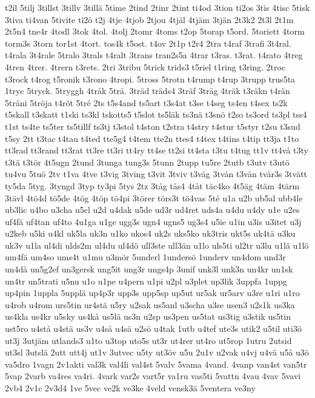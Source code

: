{t2il
5tilj
3tillst
3tillv
3tillä
5time
2tind
2tinr
2tint
ti4od
3tion
ti2os
3tis
4tisc
5tisk
3tiva
ti4van
5tivite
ti2ö
t2j
4tje
4tjob
2tjou
4tjäl
4tjäm
3tjän
2t3k2
2t3l
2t1m
2t5n4
tne4r
4todl
3tok
4tol.
4tolj
2tomr
4toms
t2op
5torap
t5ord.
5toriett
4torm
torm3s
3torn
tor1st
4tort.
tos4k
t5ost.
t4ov
2t1p
t2r4
2tra
t4raf
3trafi
3t4ral.
t4rala
3t4rale
5tralo
3trals
t4ralt
3trans
tran2s5a
4trar
t3ras.
t3rat.
t4rato
4treg
4tren
4trer.
4trern
t3rets.
2tri
3tribu
5trick
trids3
t5riel
t1ring
t3ring.
2troc
t3rock
t4rog
t5ronik
t3rono
4tropi.
5tross
5trotn
t4rump
t4rup
3trupp
trus5ta
1tryc
5tryck.
5tryggh
4tråk
5trä.
3träd
träds4
3träf
3träg
4träk
t3räkn
t4rän
5träni
5tröja
t4röt
5tré
2ts
t5s4and
ts5art
t3s4at
t3se
t4seg
ts4en
t4sex
ts2k
t5skall
t3skatt
t1ski
ts3kl
tskotts5
t5slot
ts5läk
ts3nä
t3snö
t2so
ts3ord
ts3pl
tss4
t1st
ts4te
ts5ter
ts5tillf
ts3tj
t3stol
t4ston
t2stra
t4stry
t4stur
t5styr
t2su
t3sud
t5sy
2tt
t3tac
t4tau
t4ted
tte5g4
t4tem
tte2n
ttes4
t4tex
t4tins
t4tip
tt3ja
t1to
tt3rad
tt3rand
tt3rat
tt3re
tt3ri
tt4ry
tt4se
tt2si
tt4sta
t3tu
t4tug
tt1v
tt4vå
t3ty
t3tä
t3tör
4t5ugn
2tund
3tunga
tung3s
5tunn
2tupp
tu5re
2tutb
t3utv
t3utö
tu4vu
5tuö
2tv
t1va
4tve
t3vig
3tving
t3vit
3tviv
t3våg
3tvån
t3vän
tvär3s
3tvätt
ty5da
5tyg.
3tyngd
3typ
ty3pi
5tys
2tz
3tåg
tås4
4tåt
täc4ko
4t5äg
4täm
4tärm
3tävl
4tö4d
tö5de
4tög
4töp
tö4pi
3törer
törs3t
tö4vas
5té
u1a
u2b
ub5al
ubb4le
ub3lic
u4bo
u3cha
u5cl
u2d
u4dak
u5de
ud3r
ud4ret
uds4a
u4du
u4dy
u1e
u2es
uf4fä
uf4tan
uf4to
4u1ga
u1ge
ugg3s
ugn4
ugns5
ug3s4
u5ie
u1in
u3is
u3itet
u3j
u2keb
u5ki
u4kl
uk5la
uk3n
u1ko
ukos4
uk2s
uks5ko
uk3tris
ukt5s
uk4tä
u3ku
uk3v
u1la
ul4di
ulds2m
ul4du
ul4dö
ull3ste
ull3än
u1lo
uls5ti
ul2tr
u3lu
u1lä
u1lö
um4fä
um4so
ums4t
u1mu
u3mör
5underl
1undersö
1underv
un4dom
und3r
un4då
un5g2ef
un3gersk
ung5it
ung3r
ungs4p
3unif
unk3l
unk3n
un4kr
un1sk
un4tr
un5trati
u5nu
u1o
u1pe
u4pern
u1pi
u2pl
u3plet
up3lik
3uppfa
1uppg
up4pin
1uppla
5upplä
up4p3r
upp3s
upp5sp
up5ut
ur5ak
ur5arv
u3re
u1ri
u1ro
u4rob
u4rom
urs5tin
ur4stä
u5ry
u2sak
us5anl
u3scha
u3se
usen3
u2s1k
us3ka
us4kla
us4kr
u5sky
us4kå
us5lä
us3n
u2sp
us3pen
us5tat
us3tig
u3stik
us5tin
ust5ro
u4stå
u4stä
us3v
u4så
u4sä
u2sö
u4tak
1utb
u4tef
ute3s
utik2
u5til
uti3ö
ut3j
3utjäm
utlands3
u1to
u3top
uto5s
ut3r
ut4rer
ut4ro
ut5rop
1utru
2utsid
ut3sl
3utslä
2utt
utt4j
ut1v
3utvec
u5ty
ut3öv
u5u
2u1v
u2vak
u4vj
u4vä
u5å
u3ö
va5dro
1vagn
2v1akti
val3k
val4li
val4st
5valv
5vama
4vand.
4vanp
van4st
van5tr
5vap
2varb
va4res
va4ri.
4vark
var2s
vart5r
va1ru
vas5ti
5vattn
4vau
4vav
5vavi
2vb4
2v1c
2v3d4
1ve
5vec
ve2k
ve3ke
4veld
vensk3ä
5ventera
ve3ny
}
